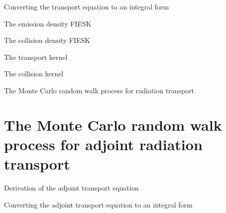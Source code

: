 \documentclass{beamer}
\begin{document}
\begin{frame}{Converting the transport equation to an integral form}

\end{frame}

\begin{frame}{The emission density FIESK}

\end{frame}

\begin{frame}{The collision density FIESK}

\end{frame}

\begin{frame}{The transport kernel}

\end{frame}

\begin{frame}{The collision kernel}

\end{frame}

\begin{frame}{The Monte Carlo random walk process for radiation transport}

\end{frame}

\section{The Monte Carlo random walk process for adjoint radiation transport}
\begin{frame}{Derivation of the adjoint transport equation}

\end{frame}

\begin{frame}{Converting the adjoint transport equation to an integral form}

\end{frame}
\end{document}
